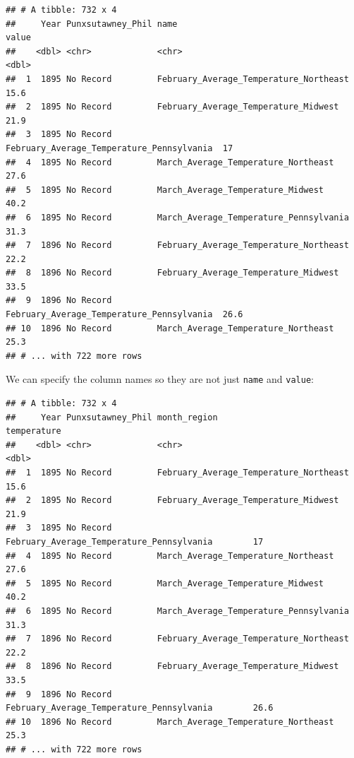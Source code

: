 \documentclass[
]{book}
\newenvironment{Shaded}{\begin{snugshade}}{\end{snugshade}}
\newcommand{\DataTypeTok}[1]{\textcolor[rgb]{0.13,0.29,0.53}{#1}}
\newcommand{\KeywordTok}[1]{\textcolor[rgb]{0.13,0.29,0.53}{\textbf{#1}}}
\newcommand{\NormalTok}[1]{#1}
\newcommand{\OperatorTok}[1]{\textcolor[rgb]{0.81,0.36,0.00}{\textbf{#1}}}
\newcommand{\StringTok}[1]{\textcolor[rgb]{0.31,0.60,0.02}{#1}}
\begin{document}
\begin{verbatim}
## # A tibble: 732 x 4
##     Year Punxsutawney_Phil name                                      value
##    <dbl> <chr>             <chr>                                     <dbl>
##  1  1895 No Record         February_Average_Temperature_Northeast     15.6
##  2  1895 No Record         February_Average_Temperature_Midwest       21.9
##  3  1895 No Record         February_Average_Temperature_Pennsylvania  17  
##  4  1895 No Record         March_Average_Temperature_Northeast        27.6
##  5  1895 No Record         March_Average_Temperature_Midwest          40.2
##  6  1895 No Record         March_Average_Temperature_Pennsylvania     31.3
##  7  1896 No Record         February_Average_Temperature_Northeast     22.2
##  8  1896 No Record         February_Average_Temperature_Midwest       33.5
##  9  1896 No Record         February_Average_Temperature_Pennsylvania  26.6
## 10  1896 No Record         March_Average_Temperature_Northeast        25.3
## # ... with 722 more rows
\end{verbatim}

We can specify the column names so they are not just \texttt{name} and \texttt{value}:

\begin{Shaded}
\end{Shaded}

\begin{verbatim}
## # A tibble: 732 x 4
##     Year Punxsutawney_Phil month_region                              temperature
##    <dbl> <chr>             <chr>                                           <dbl>
##  1  1895 No Record         February_Average_Temperature_Northeast           15.6
##  2  1895 No Record         February_Average_Temperature_Midwest             21.9
##  3  1895 No Record         February_Average_Temperature_Pennsylvania        17  
##  4  1895 No Record         March_Average_Temperature_Northeast              27.6
##  5  1895 No Record         March_Average_Temperature_Midwest                40.2
##  6  1895 No Record         March_Average_Temperature_Pennsylvania           31.3
##  7  1896 No Record         February_Average_Temperature_Northeast           22.2
##  8  1896 No Record         February_Average_Temperature_Midwest             33.5
##  9  1896 No Record         February_Average_Temperature_Pennsylvania        26.6
## 10  1896 No Record         March_Average_Temperature_Northeast              25.3
## # ... with 722 more rows
\end{verbatim}
\end{document}
